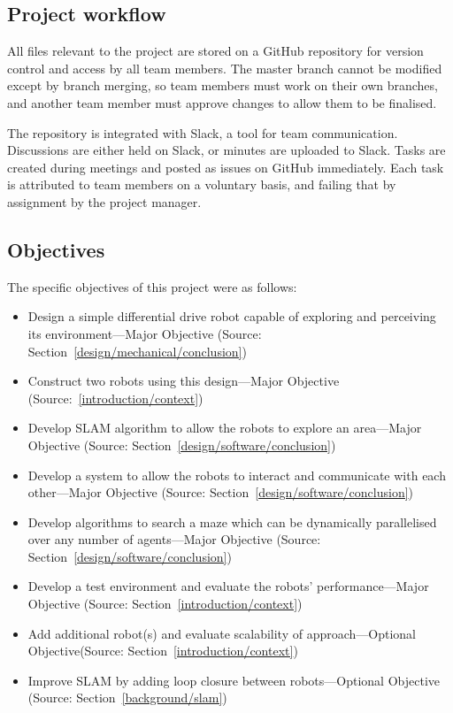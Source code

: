 \subsection{Project workflow}\label{plan/workflow}

All files relevant to the project are stored on a GitHub repository for
version control and access by all team members. The master branch cannot be
modified except by branch merging, so team members must work on their own
branches, and another team member must approve changes to allow them to be
finalised.

The repository is integrated with Slack, a tool for team communication.
Discussions are either held on Slack, or minutes are uploaded to Slack.
Tasks are created during meetings and posted as issues on GitHub immediately.
Each task is attributed to team members on a voluntary basis, and failing
that by assignment by the project manager.

\subsection{Objectives}\label{plan/objectives}

The specific objectives of this project were as follows:
\begin{itemize}
    \item{Design a simple differential drive robot capable of exploring and perceiving its environment---Major Objective (Source: Section~\ref{design/mechanical/conclusion})}
    \item{Construct two robots using this design---Major Objective (Source:~\ref{introduction/context})}
    \item{Develop SLAM algorithm to allow the robots to explore an area---Major Objective (Source: Section~\ref{design/software/conclusion})}
    \item{Develop a system to allow the robots to interact and communicate with each other---Major Objective (Source: Section~\ref{design/software/conclusion})}
    \item{Develop algorithms to search a maze which can be dynamically parallelised over any number of agents---Major Objective (Source: Section~\ref{design/software/conclusion})}
    \item{Develop a test environment and evaluate the robots’ performance---Major Objective (Source: Section~\ref{introduction/context})}
    \item{Add additional robot(s) and evaluate scalability of approach---Optional Objective(Source: Section~\ref{introduction/context})}
    \item{Improve SLAM by adding loop closure between robots---Optional Objective (Source: Section~\ref{background/slam})}
\end{itemize}


